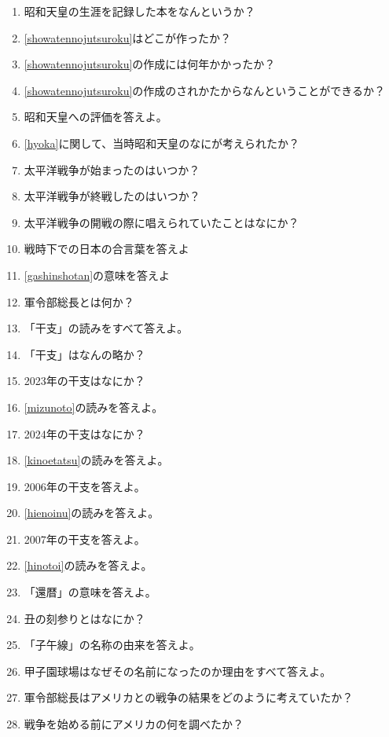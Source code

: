 \documentclass[]{jsarticle}
\begin{document}
\begin{enumerate}
		\\
	\item 昭和天皇の生涯を記録した本をなんというか？\label{showatennojutsuroku}
	\item \ref{showatennojutsuroku}はどこが作ったか？
	\item \ref{showatennojutsuroku}の作成には何年かかったか？
	\item \ref{showatennojutsuroku}の作成のされかたからなんということができるか？
	\item 昭和天皇への評価を答えよ。\label{hyoka}
	\item \ref{hyoka}に関して、当時昭和天皇のなにが考えられたか？
	\item 太平洋戦争が始まったのはいつか？
	\item 太平洋戦争が終戦したのはいつか？
	\item 太平洋戦争の開戦の際に唱えられていたことはなにか？
	\item 戦時下での日本の合言葉を答えよ\label{gashinshotan}
	\item \ref{gashinshotan}の意味を答えよ
	\item 軍令部総長とは何か？
		\\
	\item 「干支」の読みをすべて答えよ。
	\item 「干支」はなんの略か？\
	\item 2023年の干支はなにか？\label{mizunoto}
	\item \ref{mizunoto}の読みを答えよ。
	\item 2024年の干支はなにか？\label{kinoetatsu}
	\item \ref{kinoetatsu}の読みを答えよ。
	\item 2006年の干支を答えよ。\label{hienoinu}
	\item \ref{hienoinu}の読みを答えよ。
	\item 2007年の干支を答えよ。\label{hinotoi}
	\item \ref{hinotoi}の読みを答えよ。
	\item 「還暦」の意味を答えよ。
	\item 丑の刻参りとはなにか？
	\item 「子午線」の名称の由来を答えよ。
	\item 甲子園球場はなぜその名前になったのか理由をすべて答えよ。
		\\
	\item 軍令部総長はアメリカとの戦争の結果をどのように考えていたか？
	\item 戦争を始める前にアメリカの何を調べたか？

\end{enumerate}
\end{document}
